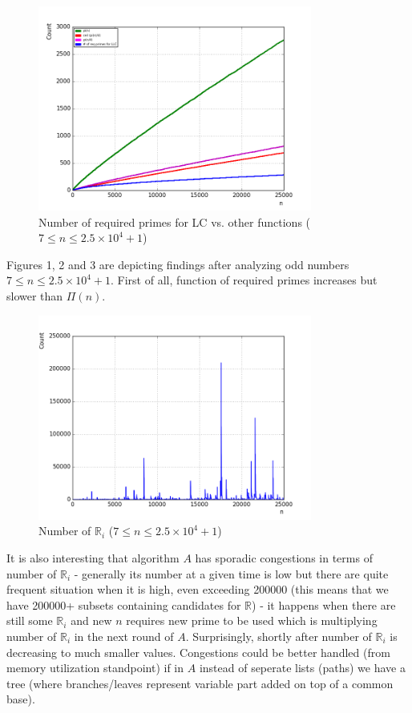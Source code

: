 \documentclass[10pt,twocolumn]{article}
\begin{document}
\begin{figure}[!ht]
\centering
\captionsetup{justification=centering}
\includegraphics[width=9cm]{f_required_primes}
\caption[caption]{Number of required primes for LC vs. other functions ($7 \leq n \leq 2.5 \times 10^4 +1$)}
\label{fig:requiredprimes}
\end{figure}	

Figures 1, 2 and 3 are depicting findings after analyzing odd numbers $7 \leq n \leq 2.5 \times 10^4 + 1$. First of all, function of required primes increases but slower than $\Pi(n)$.

\begin{figure}[!ht]
\centering
\captionsetup{justification=centering}
\includegraphics[width=9cm]{f_number_of_possible_sets}
\caption[caption]{Number of $\mathbb{R}_i$ ($7 \leq n \leq 2.5 \times 10^4 + 1$)}
\label{fig:numberofsets}
\end{figure}

It is also interesting that algorithm $A$ has sporadic congestions in terms of number of $\mathbb{R}_i$ - generally its number at a given time is low but there are quite frequent situation when it is high, even exceeding 200000 (this means that we have 200000+ subsets containing candidates for $\mathbb{R}$) - it happens when there are still some $\mathbb{R}_i$ and new $n$ requires new prime to be used which is multiplying number of $\mathbb{R}_i$ in the next round of $A$. Surprisingly, shortly after number of $\mathbb{R}_i$ is decreasing to much smaller values. Congestions could be better handled (from memory utilization standpoint) if in $A$ instead of seperate lists (paths) we have a tree (where branches/leaves represent variable part added on top of a common base).
\end{document}
